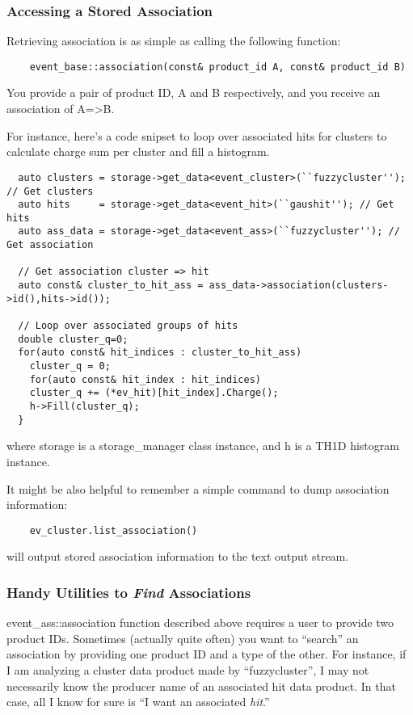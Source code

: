 \subsubsection{Accessing a Stored Association}

Retrieving association is as simple as calling the following function:
\begin{lstlisting}
    event_base::association(const& product_id A, const& product_id B)
\end{lstlisting}
You provide a pair of product ID, A and B respectively, and you receive an association of A=>B.

For instance, here's a code snipset to loop over associated hits for clusters to calculate charge sum per cluster and fill a histogram.
\begin{lstlisting}
  auto clusters = storage->get_data<event_cluster>(``fuzzycluster''); // Get clusters
  auto hits     = storage->get_data<event_hit>(``gaushit''); // Get hits
  auto ass_data = storage->get_data<event_ass>(``fuzzycluster''); // Get association

  // Get association cluster => hit
  auto const& cluster_to_hit_ass = ass_data->association(clusters->id(),hits->id());

  // Loop over associated groups of hits
  double cluster_q=0;
  for(auto const& hit_indices : cluster_to_hit_ass)
    cluster_q = 0;
    for(auto const& hit_index : hit_indices)
    cluster_q += (*ev_hit)[hit_index].Charge();
    h->Fill(cluster_q);
  }
\end{lstlisting}
where {\ttfamily storage} is a {\ttfamily storage\_manager} class instance, and {\ttfamily h} is a {\ttfamily TH1D} histogram instance.

It might be also helpful to remember a simple command to dump association information:
\begin{lstlisting}
    ev_cluster.list_association()
\end{lstlisting}
will output stored association information to the text output stream. \\

\subsubsection{Handy Utilities to {\it Find} Associations}
{\ttfamily event\_ass::association} function described above requires a user to provide two product IDs.
Sometimes (actually quite often) you want to ``search'' an association by providing one product ID and a type of the other.
For instance, if I am analyzing a cluster data product made by ``fuzzycluster'', I may not necessarily know the producer
name of an associated hit data product. In that case, all I know for sure is ``I want an associated {\it hit}.''

